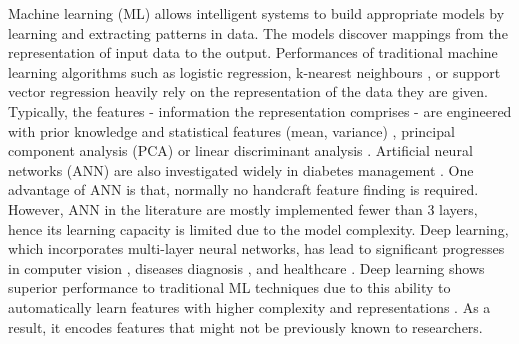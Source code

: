 \documentclass[a4paper, 10 pt, twocolumn]{IEEEtran}
\begin{document}
 {Machine learning (ML) allows intelligent systems to build appropriate models by learning and extracting patterns in data. The models discover mappings from the representation of input data to the output. Performances of
 traditional machine learning algorithms} such as logistic regression, k-nearest neighbours \cite{Karegowda-CascadingK2012}, or support vector regression \cite{Georga-MultiPred2013} heavily rely on the representation of
 the data they are given. { Typically, the features - information the representation comprises - are engineered with prior knowledge and statistical features (mean, variance) \cite{Yan-BloodGlucosePred2014}, principal
 component analysis (PCA) \cite{Abdi-PCA2010} or linear discriminant analysis \cite{Polat-ACascade2008}.}  Artificial neural networks (ANN) are also investigated widely in diabetes management
 \cite{perez-ArtiNN2010,Zecchin-NNIncor2012,Plis-AMachine2014,Mhaskar-ADeepLearningApp2017,OhioT1DM-dataset}.  {One advantage of ANN is that, normally no handcraft feature finding is required.} {However, ANN in the
 literature are mostly implemented fewer than 3 layers, hence its learning capacity is limited due to the model complexity.}
 {Deep learning, which incorporates multi-layer neural networks, has lead to significant progresses in computer vision \cite{Jia-Caffe2014}, diseases diagnosis \cite{Litjens-DLasTool2016}, and healthcare
 \cite{Miotto-DLforHealthcare2017,Zhu-DLAlg2018}.
Deep learning shows superior performance to traditional ML techniques due to this ability to automatically learn features with higher complexity and representations
\cite{Bengio-StatisticalLang2013,Schmidhuber-DLinNN2015,Li-RecurrentNeu2017,Zhang-InterpretableConv2018}. As a result, it encodes features that might not be previously known to researchers.}
\end{document}
